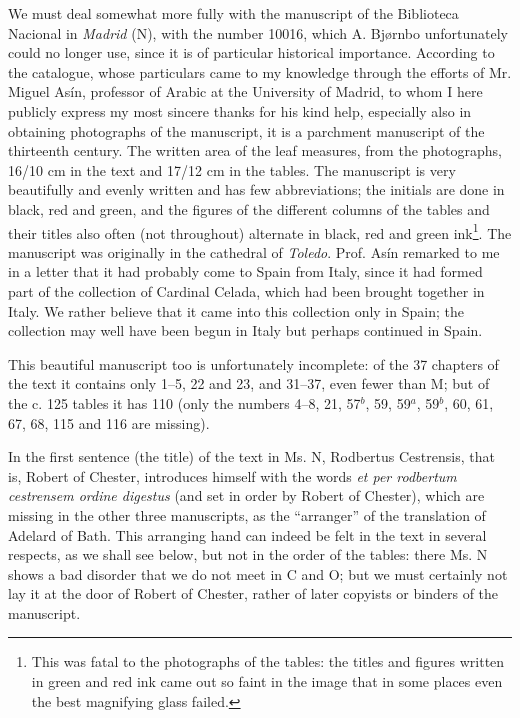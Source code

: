 \documentclass[11pt]{article}
\newcommand{\Pg}[1]{\marginpar{\footnotesize\color{gray}#1}}
\begin{document}
\par We must deal somewhat more fully with the manuscript of the Biblioteca Nacional in \emph{Madrid} (N), with the number 10016, which A. Bjørnbo unfortunately could no longer use, since it is of particular historical importance. According to the catalogue, whose particulars came to my knowledge through the efforts of Mr. Miguel Asín, professor of Arabic at the University of Madrid, to whom I here publicly express my most sincere thanks for his kind help, especially also in obtaining photographs of the manuscript, it is a parchment manuscript of the thirteenth century. The written area of the leaf measures, from the photographs, 16/10 cm in the text and 17/12 cm in the tables. The manuscript is very beautifully and evenly written and has few abbreviations; the initials are done in black, red and green, and the figures of the different columns of the tables and their titles also often (not throughout) alternate in black, red and green ink\footnote{This was fatal to the photographs of the tables: the titles and figures written in green and red ink came out so faint in the image that in some places even the best magnifying glass failed.}. The manuscript was originally in the cathedral of \emph{Toledo}. Prof. Asín remarked to me in a letter that it had probably come to Spain from Italy, since it had formed part of the collection of Cardinal Celada, which had been brought together in Italy. We rather believe that it came into this collection only in Spain; the collection may well have been begun in Italy but perhaps continued in Spain.\par
\par This beautiful manuscript too is unfortunately incomplete: of the 37 chapters of the text it contains only 1–5, 22 and 23, and 31–37, even fewer than M; but of the c. 125 tables it has 110 (only the numbers 4–8, 21, 57$^{b}$, 59, 59$^{a}$, 59$^{b}$, 60, 61, 67, 68, 115 and 116 are missing).\par
\par In the first sentence (the title) of the text in Ms. N, Rodbertus Cestrensis, that is, Robert of Chester, introduces himself with the words \emph{et per rodbertum cestrensem ordine digestus} (and set in order by Robert of Chester), \Pg{XII}which are missing in the other three manuscripts, as the “arranger” of the translation of Adelard of Bath. This arranging hand can indeed be felt in the text in several respects, as we shall see below, but not in the order of the tables: there Ms. N shows a bad disorder that we do not meet in C and O; but we must certainly not lay it at the door of Robert of Chester, rather of later copyists or binders of the manuscript.\par
\end{document}
